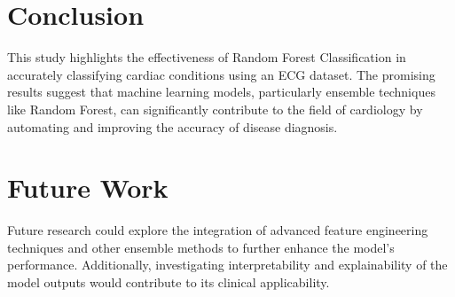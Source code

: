 \documentclass[a4paper, 12pt]{article}
\begin{document}
\section{Conclusion}
This study highlights the effectiveness of Random Forest Classification in accurately classifying cardiac conditions using an ECG dataset. The promising results suggest that machine learning models, particularly ensemble techniques like Random Forest, can significantly contribute to the field of cardiology by automating and improving the accuracy of disease diagnosis.

\section{Future Work}
Future research could explore the integration of advanced feature engineering techniques and other ensemble methods to further enhance the model's performance. Additionally, investigating interpretability and explainability of the model outputs would contribute to its clinical applicability.
\end{document}
